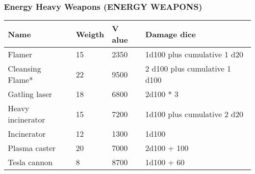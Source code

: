 
\subsubsection{Energy Heavy Weapons (ENERGY WEAPONS)}
\begin{longtable}{|p{4cm}|p{1.5cm}|p{1.5cm}|p{9cm}|}
\hline
\bfseries Name & \bfseries Weigth & \bfseries V alue & \bfseries Damage dice \\
\hline
\endhead
Flamer & 15 & 2350 & 1d100 plus cumulative 1 d20 \\
Cleansing Flame* & 22 & 9500 & 2 d100 plus cumulative 1 d100 \\
Gatling laser & 18 & 6800 & 2d100 * 3 \\
Heavy incinerator & 15 & 7200 & 1d100 plus cumulative 2 d20 \\
Incinerator & 12 & 1300 & 1d100 \\
Plasma caster & 20 & 7000 & 2d100 + 100 \\
Tesla cannon & 8 & 8700 & 1d100 + 60 \\
\hline
\end{longtable}
